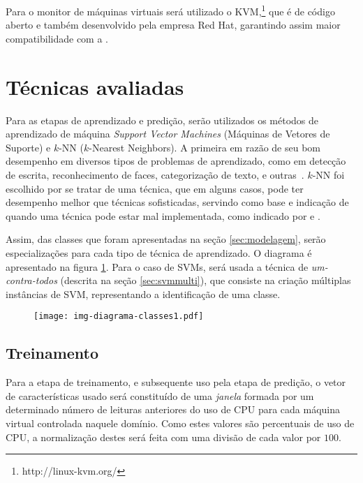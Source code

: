 Para o monitor de máquinas virtuais será utilizado o
KVM,\footnote{http://linux-kvm.org/} que é de código aberto e também
desenvolvido pela empresa Red Hat, garantindo assim maior compatibilidade
com a \libvirt{}.

\section{Técnicas avaliadas}

Para as etapas de aprendizado e predição, serão utilizados os métodos de
aprendizado de máquina \emph{Support Vector Machines} (Máquinas de Vetores
de Suporte) e $k$-NN ($k$-Nearest Neighbors). A primeira em razão de seu
bom desempenho em diversos tipos de problemas de aprendizado, como em
detecção de escrita, reconhecimento de faces, categorização de texto, e
outras~\cite{bennett2000support}. $k$-NN foi escolhido por se tratar de uma
técnica, que em alguns casos, pode ter desempenho melhor que técnicas
sofisticadas, servindo como base e indicação de quando uma técnica pode
estar mal implementada, como indicado por  e
.

Assim, das classes que foram apresentadas na seção \ref{sec:modelagem},
serão especializações para cada tipo de técnica de aprendizado. O diagrama
é apresentado na figura \ref{fig:diagramaclasses1}. Para o caso de SVMs,
será usada a técnica de \emph{um-contra-todos} (descrita na seção
\ref{sec:svmmulti}), que consiste na criação múltiplas instâncias de SVM,
representando a identificação de uma classe.

\begin{figure}[htp]
\centering
\texttt{[image: img-diagrama-classes1.pdf]}
\label{fig:diagramaclasses1}
\end{figure}

\subsection{Treinamento}

Para a etapa de treinamento, e subsequente uso pela etapa de predição, o
vetor de características usado será constituído de uma \emph{janela}
formada por um determinado número de leituras anteriores do uso de CPU para
cada máquina virtual controlada naquele domínio. Como estes valores são
percentuais de uso de CPU, a normalização destes será feita com uma divisão
de cada valor por $100$.


